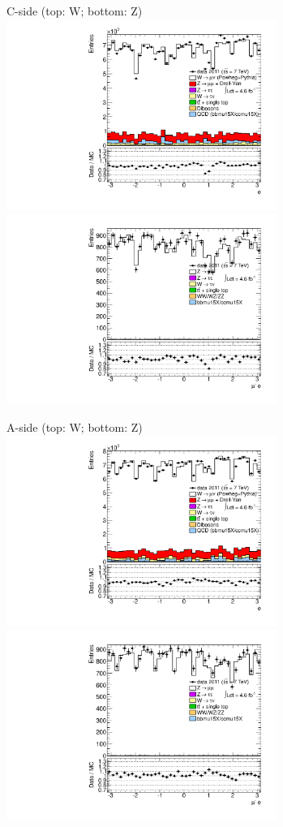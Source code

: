 {

\colb[T]

C-side (top: W; bottom: Z)
\centering
\includegraphics[width=0.66\textwidth]{dates/20130306/figures/etaphi/W_11_C_stack_l_phi_NEG} \\
\includegraphics[width=0.66\textwidth]{dates/20130306/figures/etaphi/Z_11_C_stack_lN_phi_ALL.pdf}

A-side (top: W; bottom: Z)
\centering
\includegraphics[width=0.66\textwidth]{dates/20130306/figures/etaphi/W_11_A_stack_l_phi_NEG} \\
\includegraphics[width=0.66\textwidth]{dates/20130306/figures/etaphi/Z_11_A_stack_lN_phi_ALL.pdf} 

\cole
}

